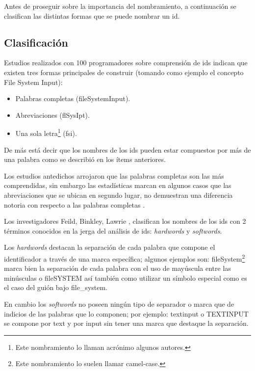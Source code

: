 \documentclass[a4paper,12pt]{report}
\begin{document}

Antes de proseguir sobre la importancia del nombramiento, a continuación se clasifican las distintas formas que se puede nombrar un id.

\subsection{Clasificación}
Estudios realizados con 100 programadores \cite{DCHD06} sobre comprensión de ids indican que existen tres formas principales de construir (tomando como ejemplo el concepto \textsf{File System Input}): 

\begin{itemize}
\itemsep0em%
\item Palabras completas (\textsf{fileSystemInput}).
\item Abreviaciones (\textsf{flSysIpt}).
\item Una sola letra\footnote[1]{Este nombramiento lo llaman acrónimo algunos autores.} (\textsf{fsi}). 
\end{itemize}

De más está decir que los nombres de los ids pueden estar compuestos por más de una palabra como se describió en los ítems anteriores.

Los estudios antedichos arrojaron que las palabras completas son las más comprendidas, sin embargo las estadísticas marcan en algunos casos que las abreviaciones que se ubican en segundo lugar, no demuestran una diferencia notoria con respecto a las palabras completas \cite{DCHD06}.

Los investigadores Feild, Binkley, Lawrie \cite{FBL06,HDD06,DMDJ13}, clasifican los nombres de los ids con 2 términos conocidos en la jerga del análisis de ids: \textit{hardwords} y \textit{softwords}.

Los \textit{hardwords} destacan la separación de cada palabra que compone el identificador a través de una marca específica; algunos ejemplos son: \mbox{\textsf{fileSystem}}\footnote[2]{Este nombramiento lo suelen llamar camel-case.} marca bien la separación de cada palabra con el uso de mayúscula entre las minúsculas o \mbox{\textsf{fileSYSTEM}} así también como utilizar un símbolo especial como es el caso del guión bajo \textsf{file\_system}. 

En cambio los \textit{softwords} no poseen ningún tipo de separador o marca que de indicios de las palabras que lo componen; por ejemplo: \textsf{textinput} o \textsf{TEXTINPUT} se compone por \textsf{text} y por \textsf{input} sin tener una marca que destaque la separación.
\end{document}

